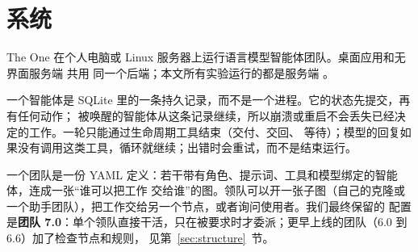 \section{系统}
\label{sec:system}

The One 在个人电脑或 Linux 服务器上运行语言模型智能体团队。桌面应用和无界面服务端  共用
同一个后端；本文所有实验运行的都是服务端 \citep{zeroth2026server}。

一个智能体是 SQLite 里的一条持久记录，而不是一个进程。它的状态先提交，再有任何动作；
被唤醒的智能体从这条记录继续，所以崩溃或重启不会丢失已经决定的工作。一轮只能通过生命周期工具结束（交付、交回、
等待）；模型的回复如果没有调用这类工具，循环就继续；出错时会重试，而不是结束运行。

一个团队是一份 YAML 定义：若干带有角色、提示词、工具和模型绑定的智能体，连成一张“谁可以把工作
交给谁”的图。领队可以开一张子图（自己的克隆或一个助手团队），把工作交给另一个节点，或者询问使用者。我们最终保留的
配置是\textbf{团队 7.0}：单个领队直接干活，只在被要求时才委派；更早上线的团队（6.0 到 6.6）加了检查节点和规则，
见第~\ref{sec:structure}~节。

